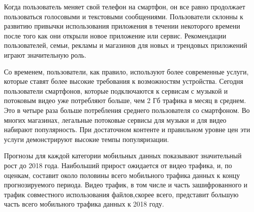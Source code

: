 Когда пользователь меняет свой телефон на смартфон, он все равно продолжает пользоваться голосовыми и текстовыми сообщениями. Пользователи склонны к развитию привычки использования приложения в течении некоторого времени после того как они открыли новое приложение или сервис. Рекомендации пользователей, семьи, рекламы и магазинов для новых и трендовых приложений играют значительную роль. 

Со временем, пользователи, как правило, используют более современные услуги, которые ставят более высокие требования к возможностям устройства. Сегодня пользователи смартфонов, которые подключаются к сервисам с музыкой и потоковым видео уже потребляют больше, чем 2 Гб трафика в месяц в среднем. Это в четыре раза больше потребления среднего пользователя со смартфоном. Во многих магазинах, легальные потоковые сервисы для музыки и для видео набирают популярность. При достаточном контенте и правильном уровне цен эти услуги демонстрируют высокие темпы популяризации.

Прогнозы для каждой категории мобильных данных показывают значительный рост до 2018 года. Наибольший прирост ожидается от видео трафика, и, по оценкам, составит около половины всего мобильного трафика данных к концу прогнозируемого периода. Видео трафик, в том числе и часть зашифрованного и трафик совместного использования файлов,скорее всего, представит большую часть всего мобильного трафика данных к 2018 году.








